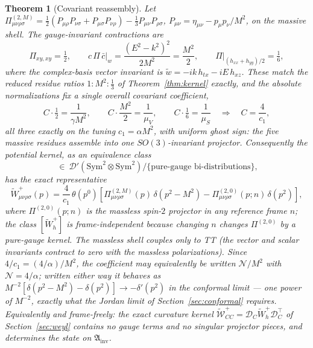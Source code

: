 \documentclass[11pt]{article}
\newtheorem{theorem}{Theorem}[section]
\theoremstyle{definition}
\theoremstyle{remark}
\begin{document}
\begin{theorem}[Covariant reassembly]\label{thm:reassembly}
Let $\Pi^{(2,M)}_{\mu\nu\rho\sigma}
=\tfrac12(P_{\mu\rho}P_{\nu\sigma}+P_{\mu\sigma}P_{\nu\rho})
-\tfrac13P_{\mu\nu}P_{\rho\sigma}$, $P_{\mu\nu}=\eta_{\mu\nu}-p_\mu
p_\nu/M^2$, on the massive shell.  The gauge-invariant contractions are
\begin{equation}
\Pi_{xy,xy}=\tfrac12,\qquad
c\,\Pi\,\bar c\big|_{w}=\frac{(E^2-k^2)^2}{2M^2}=\frac{M^2}{2},\qquad
\Pi\big|_{(h_{xx}+h_{yy})/2}=\tfrac16 ,
\end{equation}
where the complex-basis vector invariant is
$\tilde w=-ik\,h_{tx}-iE\,h_{xz}$.  These match the reduced residue ratios
$1:M^2:\tfrac13$ of Theorem~\ref{thm:kernel} exactly, and the absolute
normalizations fix a \emph{single} overall covariant coefficient,
\begin{equation}
C\cdot\tfrac12=\frac{1}{\gamma M^2},\qquad
C\cdot\frac{M^2}{2}=\frac{1}{\mu_V},\qquad
C\cdot\tfrac16=\frac{1}{\mu_S}
\quad\Longrightarrow\quad
C=\frac{4}{c_1},
\end{equation}
all three exactly on the tuning $c_1=\alpha M^2$, with uniform ghost
sign: the five massive residues assemble into one $SO(3)$-invariant
projector.  Consequently the potential kernel, as an equivalence class
\begin{equation}
[\widetilde W^+_h]\ \in\
\mathcal D'(\mathrm{Sym}^2\otimes\mathrm{Sym}^2)\big/
\{\text{pure-gauge bi-distributions}\},
\end{equation}
has the exact representative
\begin{equation}\label{eq:exactkernel}
\widetilde W^+_{\mu\nu\rho\sigma}(p)
=\frac{4}{c_1}\,\theta(p^0)\left[
\Pi^{(2,M)}_{\mu\nu\rho\sigma}(p)\,\delta(p^2-M^2)
-\Pi^{(2,0)}_{\mu\nu\rho\sigma}(p;n)\,\delta(p^2)
\right],
\end{equation}
where $\Pi^{(2,0)}(p;n)$ is the massless spin-$2$ projector in any
reference frame $n$; the class $[\widetilde W^+_h]$ is
frame-independent because changing $n$ changes $\Pi^{(2,0)}$ by a
pure-gauge kernel.  The massless shell couples only to TT (the vector and
scalar invariants contract to zero with the massless polarizations).
Since $4/c_1=(4/\alpha)/M^2$, the coefficient may equivalently be written
$\mathcal N/M^2$ with $\mathcal N=4/\alpha$; written either way it
behaves as $M^{-2}[\delta(p^2-M^2)-\delta(p^2)]\to-\delta'(p^2)$ in the
conformal limit --- one power of $M^{-2}$, exactly what the Jordan limit
of Section~\ref{sec:conformal} requires.
Equivalently and frame-freely: the exact curvature kernel
$\widetilde{\mathcal W}^+_{CC}=\mathcal D_C\widetilde W^+_h\mathcal
D_C^{\top}$ of Section~\ref{sec:weyl} contains no gauge terms and no
singular projector pieces, and determines the state on
$\mathfrak A_{\mathrm{inv}}$.
\end{theorem}
\end{document}
